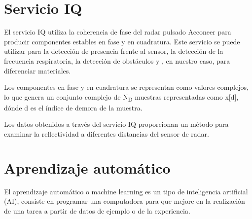 \section{Servicio IQ}

El servicio IQ utiliza la coherencia de fase del radar pulsado Acconeer para producir componentes estables en fase y en cuadratura. Este servicio se puede utilizar para la detección de presencia frente al sensor, la detección de la frecuencia respiratoria, la detección de obstáculos y , en nuestro caso, para diferenciar materiales.

Los componentes en fase y en cuadratura se representan como valores complejos, lo que genera un conjunto complejo de N\textsubscript{D} muestras representadas como x[d], dónde d es el índice de demora de la muestra.

Los datos obtenidos a través del servicio IQ proporcionan un método para examinar la reflectividad a diferentes distancias del sensor de radar.


\section{Aprendizaje automático}

El aprendizaje automático o machine learning es un tipo de inteligencia artificial (AI),
consiste en programar una computadora para que mejore en la realización de una tarea a partir de datos de ejemplo o de la experiencia.
